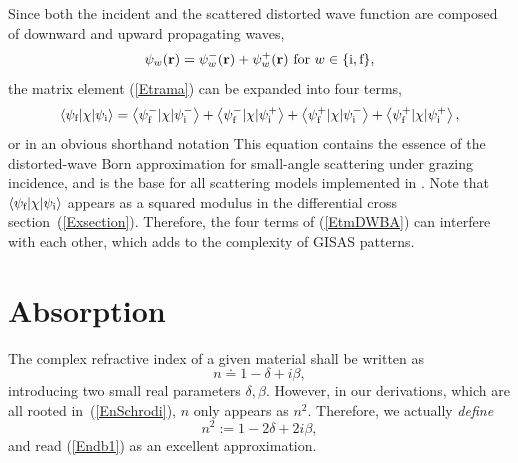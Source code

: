 Since both the incident
and the scattered distorted wave function
are composed of downward and upward propagating waves,
\begin{equation}\label{Epsipm}
  \psi_w(\mathbf{r})
  = \psi^-_w(\mathbf{r}) + \psi^+_w(\mathbf{r})\text{~for~}w\in\{\text{i},\text{f}\},
\end{equation}
%
the matrix element (\ref{Etrama})
can be expanded into four terms,
\begin{equation}\label{EtmDWBA}
  \left\langle \psi_{\text{f}}|\chi|\psi_{\text{i}}\right\rangle
  = \left\langle \psi^-_{\text{f}}|\chi|\psi^-_{\text{i}}\right\rangle
  + \left\langle \psi^-_{\text{f}}|\chi|\psi^+_{\text{i}}\right\rangle
  + \left\langle \psi^+_{\text{f}}|\chi|\psi^-_{\text{i}}\right\rangle
  + \left\langle \psi^+_{\text{f}}|\chi|\psi^+_{\text{i}}\right\rangle,
\end{equation}
%
%
or in an obvious shorthand notation
This equation contains the essence of
the distorted-wave Born approximation
for small-angle scattering under grazing incidence,
and is the base for all scattering models implemented in \BornAgain.
Note that $\left\langle \psi_{\text{f}}|\chi|\psi_{\text{i}}\right\rangle$
appears as a squared modulus
in the differential cross section~(\ref{Exsection}).
Therefore, the four terms of (\ref{EtmDWBA}) can interfere with each other,
which adds to the complexity of GISAS patterns.

%


\section{Absorption}\label{Sabsorption}

%
The complex refractive index of a given material
shall be written as
\begin{equation}\label{Endb1}
  n\doteq 1-\delta +i\beta,  
\end{equation}
%
%
introducing two small real parameters $\delta, \beta$.
However, 
in our derivations, which are all rooted in~(\ref{EnSchrodi}),
$n$ only appears as $n^2$. 
Therefore, we actually \textit{define}
\begin{equation}\label{Endb2}
  n^2:=1-2\delta+2i\beta,
\end{equation}
and read (\ref{Endb1}) as an excellent approximation.


